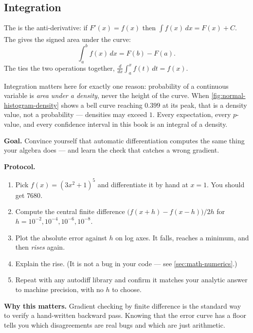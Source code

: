 \subsection{Integration}

The  is the anti-derivative: if $F'(x) = f(x)$
then $\int f(x)\,dx = F(x)+C$. The  gives the signed
area under the curve\textsuperscript{\cite{yangMathematicsCivilEngineers2018}}:
\begin{equation}
  \int_a^b f(x)\,dx = F(b)-F(a).
  \label{eq:math-integral}
\end{equation}
The  ties the two operations together,
$\frac{d}{dx}\int_a^x f(t)\,dt = f(x)$.

\begin{engineernote}
Integration matters here for exactly one reason: probability of a continuous
variable is \emph{area under a density}, never the height of the curve. When
\cref{fig:normal-histogram-density} shows a bell curve reaching $0.399$ at its
peak, that is a density value, not a probability --- densities may exceed $1$.
Every expectation, every $p$-value, and every confidence interval in this book
is an integral of a density.
\end{engineernote}

\begin{practicallab}
\textbf{Goal.} Convince yourself that automatic differentiation computes the
same thing your algebra does --- and learn the check that catches a wrong
gradient.

\textbf{Protocol.}
\begin{enumerate}
  \item Pick $f(x) = (3x^2+1)^5$ and differentiate it by hand at $x=1$. You
        should get $7680$.
  \item Compute the central finite difference
        $\bigl(f(x+h)-f(x-h)\bigr)/2h$ for $h = 10^{-2}, 10^{-4}, 10^{-6},
        10^{-8}$.
  \item Plot the absolute error against $h$ on log axes. It falls, reaches a
        minimum, and then \emph{rises} again.
  \item Explain the rise. (It is not a bug in your code --- see
        \cref{sec:math-numerics}.)
  \item Repeat with any autodiff library and confirm it matches your analytic
        answer to machine precision, with no $h$ to choose.
\end{enumerate}

\textbf{Why this matters.} Gradient checking by finite difference is the
standard way to verify a hand-written backward pass. Knowing that the error
curve has a floor tells you which disagreements are real bugs and which are
just arithmetic.
\end{practicallab}

